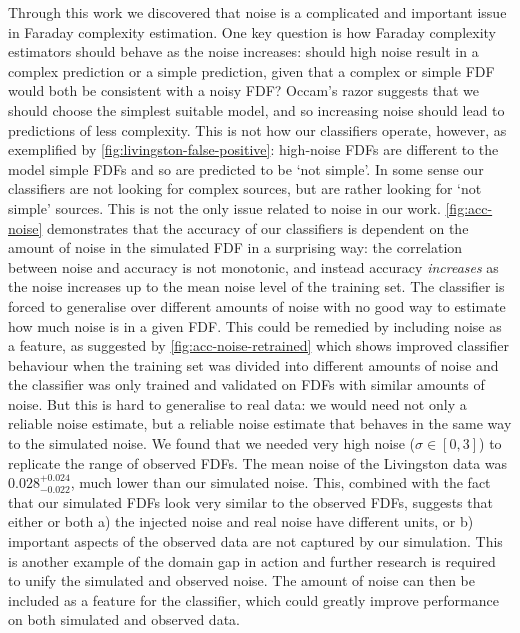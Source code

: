   Through this work we discovered that noise is a complicated and important issue in Faraday complexity estimation. One key question is how Faraday complexity estimators should behave as the noise increases: should high noise result in a complex prediction or a simple prediction, given that a complex or simple FDF would both be consistent with a noisy FDF? Occam's razor suggests that we should choose the simplest suitable model, and so increasing noise should lead to predictions of less complexity. This is not how our classifiers operate, however, as exemplified by \autoref{fig:livingston-false-positive}: high-noise FDFs are different to the model simple FDFs and so are predicted to be `not simple'. In some sense our classifiers are not looking for complex sources, but are rather looking for `not simple' sources. This is not the only issue related to noise in our work. \autoref{fig:acc-noise} demonstrates that the accuracy of our classifiers is dependent on the amount of noise in the simulated FDF in a surprising way: the correlation between noise and accuracy is not monotonic, and instead accuracy \emph{increases} as the noise increases up to the mean noise level of the training set. The classifier is forced to generalise over different amounts of noise with no good way to estimate how much noise is in a given FDF. This could be remedied by including noise as a feature, as suggested by \autoref{fig:acc-noise-retrained} which shows improved classifier behaviour when the training set was divided into different amounts of noise and the classifier was only trained and validated on FDFs with similar amounts of noise. But this is hard to generalise to real data: we would need not only a reliable noise estimate, but a reliable noise estimate that behaves in the same way to the simulated noise. We found that we needed very high noise ($\sigma \in [0, 3]$) to replicate the range of observed FDFs. The mean noise of the Livingston data was $0.028_{-0.022}^{+0.024}$, much lower than our simulated noise. This, combined with the fact that our simulated FDFs look very similar to the observed FDFs, suggests that either or both a) the injected noise and real noise have different units, or b) important aspects of the observed data are not captured by our simulation. This is another example of the domain gap in action and further research is required to unify the simulated and observed noise. The amount of noise can then be included as a feature for the classifier, which could greatly improve performance on both simulated and observed data.

